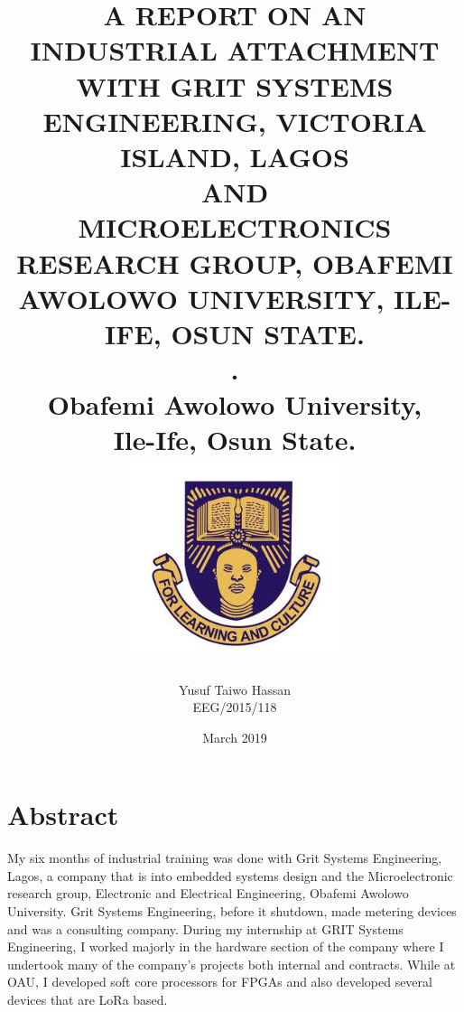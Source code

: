 \documentclass[12pt]{report}
\begin{document}
\title{
A REPORT ON
AN INDUSTRIAL ATTACHMENT WITH
GRIT SYSTEMS ENGINEERING,
VICTORIA ISLAND, LAGOS\\
AND\\ 
MICROELECTRONICS RESEARCH GROUP, OBAFEMI AWOLOWO UNIVERSITY, ILE-IFE, OSUN STATE.\\
  .\\
{\huge Obafemi Awolowo University,\\ Ile-Ife, Osun State.}\\
{\includegraphics[scale=0.35]{university.png}}
}
\author{\huge Yusuf Taiwo Hassan\\ EEG/2015/118}
\date{\large March 2019}

\maketitle



%









\chapter*{Abstract}
My six months of industrial training was done with Grit Systems Engineering,
Lagos, a company that is into embedded systems design and the Microelectronic research group, Electronic and Electrical Engineering, Obafemi Awolowo University. Grit Systems Engineering, before it shutdown, made metering devices and was a consulting company.
During my internship at GRIT Systems Engineering, I worked majorly in the hardware section of the company
where I undertook many of the company's projects both internal and contracts. While at OAU, I developed soft core processors for FPGAs and also developed several devices that are LoRa based.
\end{document}
